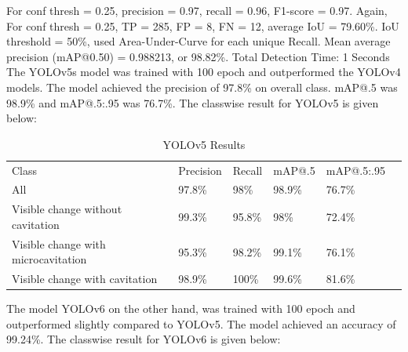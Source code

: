For conf thresh = 0.25, precision = 0.97, recall = 0.96, F1-score = 0.97. Again, For conf thresh = 0.25, TP = 285, FP = 8, FN = 12, average IoU = 79.60\%. IoU threshold = 50\%, used Area-Under-Curve for each unique Recall. Mean average precision (mAP@0.50) = 0.988213, or 98.82\%. Total Detection Time: 1 Seconds\\
The YOLOv5s model was trained with 100 epoch and outperformed the YOLOv4 models. The model achieved the precision of 97.8\% on overall class. mAP@.5 was 98.9\% and mAP@.5:.95 was 76.7\%. The classwise result for YOLOv5 is given below:
\begin{table}[H]
\caption{YOLOv5 Results}
\centering
\begin{tabular}{|l|l|l|l|l|l} 
\cline{1-5}
\textcolor[rgb]{0.141,0.125,0.129}{Class}                               & \textcolor[rgb]{0.141,0.125,0.129}{Precision} & \textcolor[rgb]{0.141,0.125,0.129}{Recall} & \textcolor[rgb]{0.141,0.125,0.129}{mAP@.5} & \textcolor[rgb]{0.141,0.125,0.129}{mAP@.5:.95} &   \\ 
\cline{1-5}
\textcolor[rgb]{0.141,0.125,0.129}{All}                                 & \textcolor[rgb]{0.141,0.125,0.129}{97.8\%}    & \textcolor[rgb]{0.141,0.125,0.129}{98\%}   & \textcolor[rgb]{0.141,0.125,0.129}{98.9\%} & \textcolor[rgb]{0.141,0.125,0.129}{76.7\%}     &   \\ 
\cline{1-5}
\textcolor[rgb]{0.141,0.125,0.129}{Visible change without cavitation}   & \textcolor[rgb]{0.141,0.125,0.129}{99.3\%}    & \textcolor[rgb]{0.141,0.125,0.129}{95.8\%} & \textcolor[rgb]{0.141,0.125,0.129}{98\%}   & \textcolor[rgb]{0.141,0.125,0.129}{72.4\%}     &   \\ 
\cline{1-5}
\textcolor[rgb]{0.141,0.125,0.129}{Visible change with microcavitation} & \textcolor[rgb]{0.141,0.125,0.129}{95.3\%}    & \textcolor[rgb]{0.141,0.125,0.129}{98.2\%} & \textcolor[rgb]{0.141,0.125,0.129}{99.1\%} & \textcolor[rgb]{0.141,0.125,0.129}{76.1\%}     &   \\ 
\cline{1-5}
\textcolor[rgb]{0.141,0.125,0.129}{Visible change with cavitation}      & \textcolor[rgb]{0.141,0.125,0.129}{98.9\%}    & \textcolor[rgb]{0.141,0.125,0.129}{100\%}  & \textcolor[rgb]{0.141,0.125,0.129}{99.6\%} & \textcolor[rgb]{0.141,0.125,0.129}{81.6\%}     &   \\ 
\cline{1-5}
\end{tabular}
\end{table}
The model YOLOv6 on the other hand, was trained with 100 epoch and outperformed slightly compared to YOLOv5. The model achieved an accuracy of 99.24\%. The classwise result for YOLOv6 is given below:
